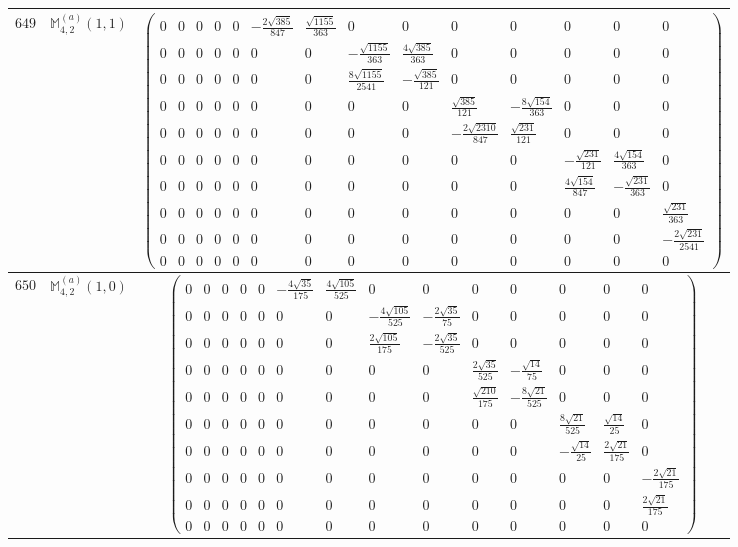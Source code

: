\documentclass[fleqn,8pt,landscape]{jsarticle}
\begin{document}
\begin{center}
\begin{longtable}{ccc}
$ 649 $ & $ \mathbb{M}_{4,2}^{(a)}(1,1) $ & $ \begin{pmatrix} 0 & 0 & 0 & 0 & 0 & - \frac{2 \sqrt{385}}{847} & \frac{\sqrt{1155}}{363} & 0 & 0 & 0 & 0 & 0 & 0 & 0 \\ 0 & 0 & 0 & 0 & 0 & 0 & 0 & - \frac{\sqrt{1155}}{363} & \frac{4 \sqrt{385}}{363} & 0 & 0 & 0 & 0 & 0 \\ 0 & 0 & 0 & 0 & 0 & 0 & 0 & \frac{8 \sqrt{1155}}{2541} & - \frac{\sqrt{385}}{121} & 0 & 0 & 0 & 0 & 0 \\ 0 & 0 & 0 & 0 & 0 & 0 & 0 & 0 & 0 & \frac{\sqrt{385}}{121} & - \frac{8 \sqrt{154}}{363} & 0 & 0 & 0 \\ 0 & 0 & 0 & 0 & 0 & 0 & 0 & 0 & 0 & - \frac{2 \sqrt{2310}}{847} & \frac{\sqrt{231}}{121} & 0 & 0 & 0 \\ 0 & 0 & 0 & 0 & 0 & 0 & 0 & 0 & 0 & 0 & 0 & - \frac{\sqrt{231}}{121} & \frac{4 \sqrt{154}}{363} & 0 \\ 0 & 0 & 0 & 0 & 0 & 0 & 0 & 0 & 0 & 0 & 0 & \frac{4 \sqrt{154}}{847} & - \frac{\sqrt{231}}{363} & 0 \\ 0 & 0 & 0 & 0 & 0 & 0 & 0 & 0 & 0 & 0 & 0 & 0 & 0 & \frac{\sqrt{231}}{363} \\ 0 & 0 & 0 & 0 & 0 & 0 & 0 & 0 & 0 & 0 & 0 & 0 & 0 & - \frac{2 \sqrt{231}}{2541} \\ 0 & 0 & 0 & 0 & 0 & 0 & 0 & 0 & 0 & 0 & 0 & 0 & 0 & 0 \end{pmatrix} $ \\ \hline
$ 650 $ & $ \mathbb{M}_{4,2}^{(a)}(1,0) $ & $ \begin{pmatrix} 0 & 0 & 0 & 0 & 0 & - \frac{4 \sqrt{35}}{175} & \frac{4 \sqrt{105}}{525} & 0 & 0 & 0 & 0 & 0 & 0 & 0 \\ 0 & 0 & 0 & 0 & 0 & 0 & 0 & - \frac{4 \sqrt{105}}{525} & - \frac{2 \sqrt{35}}{75} & 0 & 0 & 0 & 0 & 0 \\ 0 & 0 & 0 & 0 & 0 & 0 & 0 & \frac{2 \sqrt{105}}{175} & - \frac{2 \sqrt{35}}{525} & 0 & 0 & 0 & 0 & 0 \\ 0 & 0 & 0 & 0 & 0 & 0 & 0 & 0 & 0 & \frac{2 \sqrt{35}}{525} & - \frac{\sqrt{14}}{75} & 0 & 0 & 0 \\ 0 & 0 & 0 & 0 & 0 & 0 & 0 & 0 & 0 & \frac{\sqrt{210}}{175} & - \frac{8 \sqrt{21}}{525} & 0 & 0 & 0 \\ 0 & 0 & 0 & 0 & 0 & 0 & 0 & 0 & 0 & 0 & 0 & \frac{8 \sqrt{21}}{525} & \frac{\sqrt{14}}{25} & 0 \\ 0 & 0 & 0 & 0 & 0 & 0 & 0 & 0 & 0 & 0 & 0 & - \frac{\sqrt{14}}{25} & \frac{2 \sqrt{21}}{175} & 0 \\ 0 & 0 & 0 & 0 & 0 & 0 & 0 & 0 & 0 & 0 & 0 & 0 & 0 & - \frac{2 \sqrt{21}}{175} \\ 0 & 0 & 0 & 0 & 0 & 0 & 0 & 0 & 0 & 0 & 0 & 0 & 0 & \frac{2 \sqrt{21}}{175} \\ 0 & 0 & 0 & 0 & 0 & 0 & 0 & 0 & 0 & 0 & 0 & 0 & 0 & 0 \end{pmatrix} $ \\ \hline

\end{longtable}
\end{center}
\end{document}
